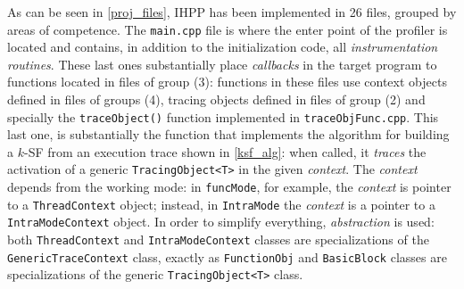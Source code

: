 \documentclass[a4paper,10pt]{report}
\begin{document}
As can be seen in \cref{proj_files}, IHPP has been implemented in 26 files,
grouped by areas of competence. The \verb|main.cpp| file is where the enter point
 of the profiler is located and contains, in addition to the initialization code, all \emph{instrumentation routines}. These last ones substantially place \emph{callbacks}
in the target program to functions located in files of group (3): functions in these
files use context objects defined in files of groups (4),
tracing objects defined in files of group (2) and specially
the \verb|traceObject()| function implemented in \verb|traceObjFunc.cpp|.
This last one, is substantially the function that implements the algorithm for building
a $k$-SF from an execution trace shown in \cref{ksf_alg}:
when called, it \emph{traces} the activation of a generic \verb|TracingObject<T>|
in the given \emph{context}. The \emph{context} depends from the working mode:
in \verb|funcMode|, for example, the \emph{context} is pointer to a \verb|ThreadContext| object; instead, in \verb|IntraMode| the \emph{context} is
a pointer to a \verb|IntraModeContext| object. In order to simplify everything,
\emph{abstraction} is used:
both \verb|ThreadContext| and \verb|IntraModeContext| classes
are specializations of
the \verb|GenericTraceContext| class, exactly as \verb|FunctionObj| and
\verb|BasicBlock| classes are specializations of the generic \verb|TracingObject<T>| class.
\end{document}
